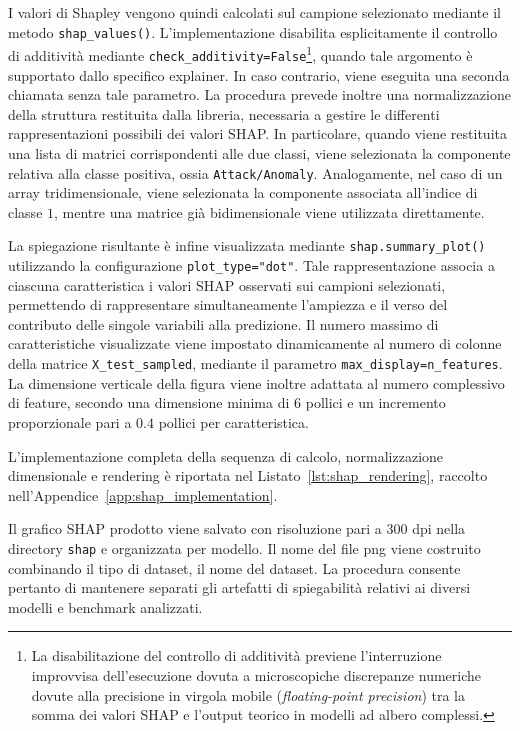 I valori di Shapley vengono quindi calcolati sul campione selezionato mediante il metodo \texttt{shap\_values()}. 
L'implementazione disabilita esplicitamente il controllo di additività mediante \texttt{check\_additivity=False}\footnote{La disabilitazione del controllo di additività previene l'interruzione improvvisa dell'esecuzione dovuta a microscopiche discrepanze numeriche dovute alla precisione in virgola mobile (\textit{floating-point precision}) tra la somma dei valori SHAP e l'output teorico in modelli ad albero complessi.}, quando tale argomento è supportato dallo specifico explainer. 
In caso contrario, viene eseguita una seconda chiamata senza tale parametro. La procedura prevede inoltre una normalizzazione della struttura restituita dalla libreria, necessaria a gestire le differenti rappresentazioni possibili dei valori SHAP. 
In particolare, quando viene restituita una lista di matrici corrispondenti alle due classi, viene selezionata la componente relativa alla classe positiva, ossia \texttt{Attack/Anomaly}. 
Analogamente, nel caso di un array tridimensionale, viene selezionata la componente associata all'indice di classe $1$, mentre una matrice già bidimensionale viene utilizzata direttamente.

La spiegazione risultante è infine visualizzata mediante \texttt{shap.summary\_plot()} utilizzando la configurazione \texttt{plot\_type="dot"}. 
Tale rappresentazione associa a ciascuna caratteristica i valori SHAP osservati sui campioni selezionati, permettendo di rappresentare simultaneamente l'ampiezza e il verso del contributo delle singole variabili alla predizione. 
Il numero massimo di caratteristiche visualizzate viene impostato dinamicamente al numero di colonne della matrice \texttt{X\_test\_sampled}, mediante il parametro \texttt{max\_display=n\_features}. 
La dimensione verticale della figura viene inoltre adattata al numero complessivo di feature, secondo una dimensione minima di $6$ pollici e un incremento proporzionale pari a $0.4$ pollici per caratteristica.

L'implementazione completa della sequenza di calcolo, normalizzazione dimensionale e rendering è riportata nel Listato~\ref{lst:shap_rendering}, raccolto nell'Appendice~\ref{app:shap_implementation}.

Il grafico SHAP prodotto viene salvato con risoluzione pari a $300$ dpi nella directory \texttt{shap} e organizzata per modello. 
Il nome del file png viene costruito combinando il tipo di dataset, il nome del dataset. 
La procedura consente pertanto di mantenere separati gli artefatti di spiegabilità relativi ai diversi modelli e benchmark analizzati.

